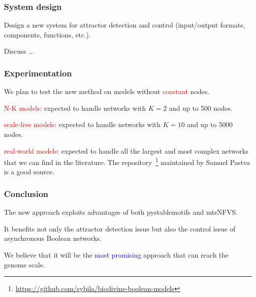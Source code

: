 \documentclass{beamer}              %
\newcommand{\blue}[1]{\textcolor{blue}{#1}}
\newcommand{\red}[1]{\textcolor{red}{#1}}
\begin{document}
\begin{frame}
\frametitle{System design}

Design a new system for attractor detection and control (input/output formats, components, functions, etc.).

\hspace{0.8cm}

Discuss \dots

\end{frame}


\begin{frame}
\frametitle{Experimentation}

We plan to test the new method on models without \red{constant} nodes.

\hspace{0.8cm}

\red{N-K models}: expected to handle networks with \(K = 2\) and up to 500 nodes.

\hspace{0.8cm}

\red{scale-free models}: expected to handle networks with \(K = 10\) and up to 5000 nodes.

\hspace{0.8cm}

\red{real-world models}: expected to handle all the largest and most complex networks that we can find in the literature. The repository~\footnote{\url{https://github.com/sybila/biodivine-boolean-models}} maintained by Samuel Pastva is a good source.

\end{frame}

\begin{frame}
\frametitle{Conclusion}

The new approach exploits advantages of both pystablemotifs and mtsNFVS.

\hspace{0.8cm}

It benefits not only the attractor detection issue but also the control issue of asynchronous Boolean networks.

\hspace{0.8cm}

We believe that it will be the \blue{most promising} approach that can reach the genome scale.

\end{frame}
\end{document}
